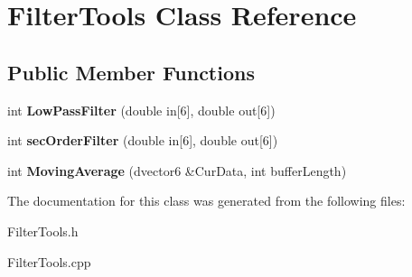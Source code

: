 \hypertarget{classFilterTools}{\section{Filter\-Tools Class Reference}
\label{classFilterTools}
}
\subsection*{Public Member Functions}
\begin{DoxyCompactItemize}
\item 
\hypertarget{classFilterTools_ae839ed88a927243b02d95bdf5360a2fe}{int {\bfseries Low\-Pass\-Filter} (double in\mbox{[}6\mbox{]}, double out\mbox{[}6\mbox{]})}\label{classFilterTools_ae839ed88a927243b02d95bdf5360a2fe}

\item 
\hypertarget{classFilterTools_a528bd90b55c850cf715e939fd37e1c3a}{int {\bfseries sec\-Order\-Filter} (double in\mbox{[}6\mbox{]}, double out\mbox{[}6\mbox{]})}\label{classFilterTools_a528bd90b55c850cf715e939fd37e1c3a}

\item 
\hypertarget{classFilterTools_af5dd2e29ef50ed727618bc9556935899}{int {\bfseries Moving\-Average} (dvector6 \&Cur\-Data, int buffer\-Length)}\label{classFilterTools_af5dd2e29ef50ed727618bc9556935899}

\end{DoxyCompactItemize}


The documentation for this class was generated from the following files\-:\begin{DoxyCompactItemize}
\item 
Filter\-Tools.\-h\item 
Filter\-Tools.\-cpp\end{DoxyCompactItemize}
